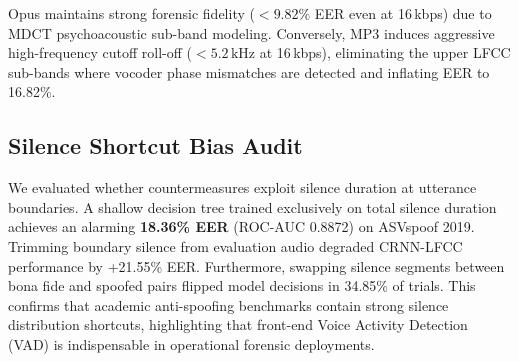 \documentclass[conference]{IEEEtran}
\begin{document}
\begin{table}[htbp]
\caption{Lossy Codec Compression Stress-Testing Matrix}
\label{tab:codecs}
\centering
{}
\end{table}

Opus maintains strong forensic fidelity ($<9.82\%$ EER even at 16\,kbps) due to MDCT psychoacoustic sub-band modeling. Conversely, MP3 induces aggressive high-frequency cutoff roll-off ($<5.2\,\text{kHz}$ at 16\,kbps), eliminating the upper LFCC sub-bands where vocoder phase mismatches are detected and inflating EER to 16.82\%.

\subsection{Silence Shortcut Bias Audit}
We evaluated whether countermeasures exploit silence duration at utterance boundaries. A shallow decision tree trained exclusively on total silence duration achieves an alarming \textbf{18.36\% EER} (ROC-AUC 0.8872) on ASVspoof 2019. Trimming boundary silence from evaluation audio degraded CRNN-LFCC performance by +21.55\% EER. Furthermore, swapping silence segments between bona fide and spoofed pairs flipped model decisions in 34.85\% of trials. This confirms that academic anti-spoofing benchmarks contain strong silence distribution shortcuts, highlighting that front-end Voice Activity Detection (VAD) is indispensable in operational forensic deployments.
\end{document}
